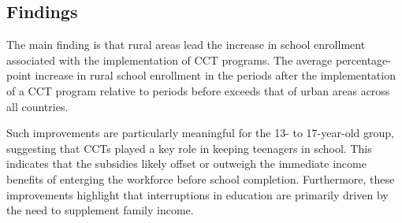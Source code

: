 \documentclass[
  10pt,
]{article}
\begin{document}
\subsection{Findings}\label{findings}

The main finding is that rural areas lead the increase in school
enrollment associated with the implementation of CCT programs. The
average percentage-point increase in rural school enrollment in the
periods after the implementation of a CCT program relative to periods
before exceeds that of urban areas across all countries.

Such improvements are particularly meaningful for the 13- to 17-year-old
group, suggesting that CCTs played a key role in keeping teenagers in
school. This indicates that the subsidies likely offset or outweigh the
immediate income benefits of enterging the workforce before school
completion. Furthermore, these improvements highlight that interruptions
in education are primarily driven by the need to supplement family
income.
\end{document}
